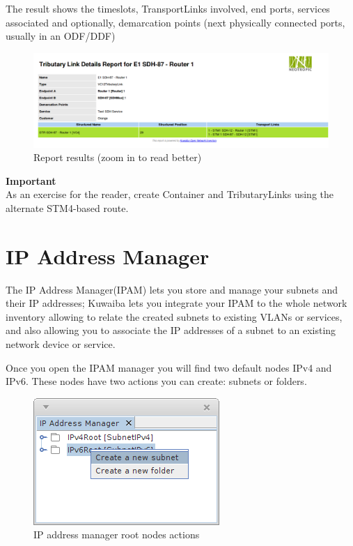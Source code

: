 \documentclass[a4paper]{article}
\begin{document}
		The result shows the timeslots, TransportLinks involved, end ports, services associated and optionally, demarcation points (next physically connected ports, usually in an ODF/DDF)
		\begin{figure}[h!]
			\centering
			\includegraphics[width=\linewidth]{img/sdh_module_tributary_link_report.png}
			\caption{Report results (zoom in to read better)}
			\label{fig:sdh_module_tributary_link_report}
			\end{figure}
		
		\begin{framed} {\large \textbf{Important}}\\
			As an exercise for the reader, create Container and TributaryLinks using the alternate STM4-based route.
		\end{framed}	
		
		\newpage
		\section{IP Address Manager}\label{sec:ip_address_manager}
		The IP Address Manager(IPAM) lets you store and manage your subnets and their IP addresses; Kuwaiba lets you integrate your IPAM to the whole network inventory allowing to relate the created subnets to existing VLANs or services, and also allowing you to associate the IP addresses of a subnet to an existing network device or service.
		
		Once you open the IPAM manager you will find two default nodes IPv4 and IPv6.
		These nodes have two actions you can create: subnets or folders.
		\begin{figure}[h!]
			\centering
			\includegraphics[width=0.4\linewidth]{img/ipam_root_nodes_actions.png}
			\caption{IP address manager root nodes actions}
			\label{fig:ipam_root_nodes_actions}
		\end{figure}
		
\end{document}
